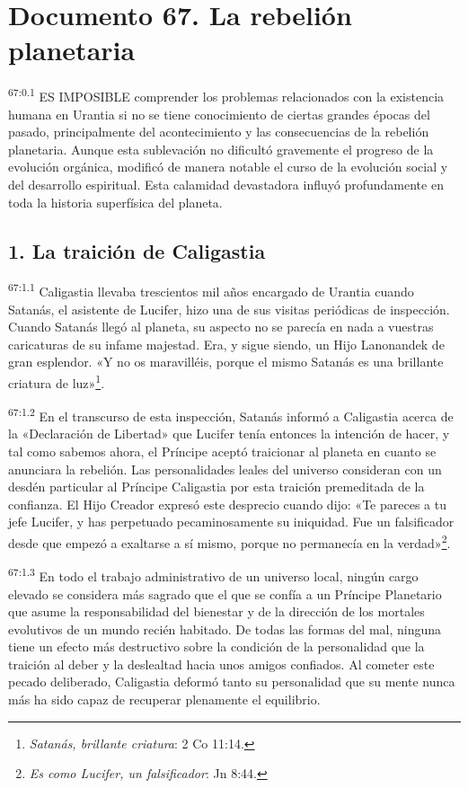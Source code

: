 \chapter{Documento 67. La rebelión planetaria}
\par
\textsuperscript{67:0.1} ES IMPOSIBLE comprender los problemas relacionados con la existencia humana en Urantia si no se tiene conocimiento de ciertas grandes épocas del pasado, principalmente del acontecimiento y las consecuencias de la rebelión planetaria. Aunque esta sublevación no dificultó gravemente el progreso de la evolución orgánica, modificó de manera notable el curso de la evolución social y del desarrollo espiritual. Esta calamidad devastadora influyó profundamente en toda la historia superfísica del planeta.

\section*{1. La traición de Caligastia}
\par
\textsuperscript{67:1.1} Caligastia llevaba trescientos mil años encargado de Urantia cuando Satanás, el asistente de Lucifer, hizo una de sus visitas periódicas de inspección. Cuando Satanás llegó al planeta, su aspecto no se parecía en nada a vuestras caricaturas de su infame majestad. Era, y sigue siendo, un Hijo Lanonandek de gran esplendor. «Y no os maravilléis, porque el mismo Satanás es una brillante criatura de luz»\footnote{\textit{Satanás, brillante criatura}: 2 Co 11:14.}.

\par
\textsuperscript{67:1.2} En el transcurso de esta inspección, Satanás informó a Caligastia acerca de la «Declaración de Libertad» que Lucifer tenía entonces la intención de hacer, y tal como sabemos ahora, el Príncipe aceptó traicionar al planeta en cuanto se anunciara la rebelión. Las personalidades leales del universo consideran con un desdén particular al Príncipe Caligastia por esta traición premeditada de la confianza. El Hijo Creador expresó este desprecio cuando dijo: «Te pareces a tu jefe Lucifer, y has perpetuado pecaminosamente su iniquidad. Fue un falsificador desde que empezó a exaltarse a sí mismo, porque no permanecía en la verdad»\footnote{\textit{Es como Lucifer, un falsificador}: Jn 8:44.}.

\par
\textsuperscript{67:1.3} En todo el trabajo administrativo de un universo local, ningún cargo elevado se considera más sagrado que el que se confía a un Príncipe Planetario que asume la responsabilidad del bienestar y de la dirección de los mortales evolutivos de un mundo recién habitado. De todas las formas del mal, ninguna tiene un efecto más destructivo sobre la condición de la personalidad que la traición al deber y la deslealtad hacia unos amigos confiados. Al cometer este pecado deliberado, Caligastia deformó tanto su personalidad que su mente nunca más ha sido capaz de recuperar plenamente el equilibrio.

